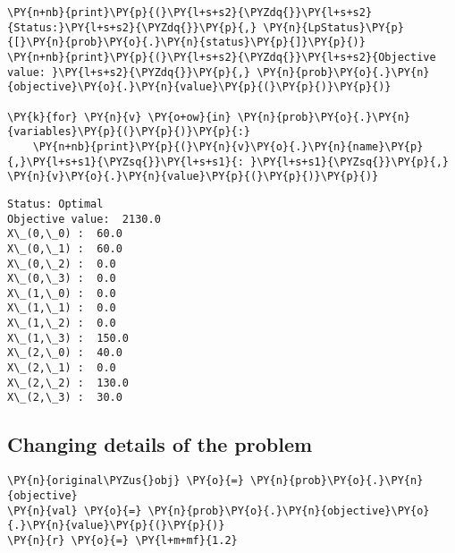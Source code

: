     \begin{tcolorbox}[breakable, size=fbox, boxrule=1pt, pad at break*=1mm,colback=cellbackground, colframe=cellborder]
\begin{Verbatim}[commandchars=\\\{\}]
\PY{n+nb}{print}\PY{p}{(}\PY{l+s+s2}{\PYZdq{}}\PY{l+s+s2}{Status:}\PY{l+s+s2}{\PYZdq{}}\PY{p}{,} \PY{n}{LpStatus}\PY{p}{[}\PY{n}{prob}\PY{o}{.}\PY{n}{status}\PY{p}{]}\PY{p}{)}
\PY{n+nb}{print}\PY{p}{(}\PY{l+s+s2}{\PYZdq{}}\PY{l+s+s2}{Objective value: }\PY{l+s+s2}{\PYZdq{}}\PY{p}{,} \PY{n}{prob}\PY{o}{.}\PY{n}{objective}\PY{o}{.}\PY{n}{value}\PY{p}{(}\PY{p}{)}\PY{p}{)}

\PY{k}{for} \PY{n}{v} \PY{o+ow}{in} \PY{n}{prob}\PY{o}{.}\PY{n}{variables}\PY{p}{(}\PY{p}{)}\PY{p}{:}
    \PY{n+nb}{print}\PY{p}{(}\PY{n}{v}\PY{o}{.}\PY{n}{name}\PY{p}{,}\PY{l+s+s1}{\PYZsq{}}\PY{l+s+s1}{: }\PY{l+s+s1}{\PYZsq{}}\PY{p}{,} \PY{n}{v}\PY{o}{.}\PY{n}{value}\PY{p}{(}\PY{p}{)}\PY{p}{)}
\end{Verbatim}
\end{tcolorbox}

    \begin{Verbatim}[commandchars=\\\{\}]
Status: Optimal
Objective value:  2130.0
X\_(0,\_0) :  60.0
X\_(0,\_1) :  60.0
X\_(0,\_2) :  0.0
X\_(0,\_3) :  0.0
X\_(1,\_0) :  0.0
X\_(1,\_1) :  0.0
X\_(1,\_2) :  0.0
X\_(1,\_3) :  150.0
X\_(2,\_0) :  40.0
X\_(2,\_1) :  0.0
X\_(2,\_2) :  130.0
X\_(2,\_3) :  30.0
    \end{Verbatim}

    \hypertarget{changing-details-of-the-problem}{%
\subsection{Changing details of the
problem}\label{changing-details-of-the-problem}}

    \begin{tcolorbox}[breakable, size=fbox, boxrule=1pt, pad at break*=1mm,colback=cellbackground, colframe=cellborder]
\begin{Verbatim}[commandchars=\\\{\}]
\PY{n}{original\PYZus{}obj} \PY{o}{=} \PY{n}{prob}\PY{o}{.}\PY{n}{objective}
\PY{n}{val} \PY{o}{=} \PY{n}{prob}\PY{o}{.}\PY{n}{objective}\PY{o}{.}\PY{n}{value}\PY{p}{(}\PY{p}{)}
\PY{n}{r} \PY{o}{=} \PY{l+m+mf}{1.2}
\end{Verbatim}
\end{tcolorbox}

